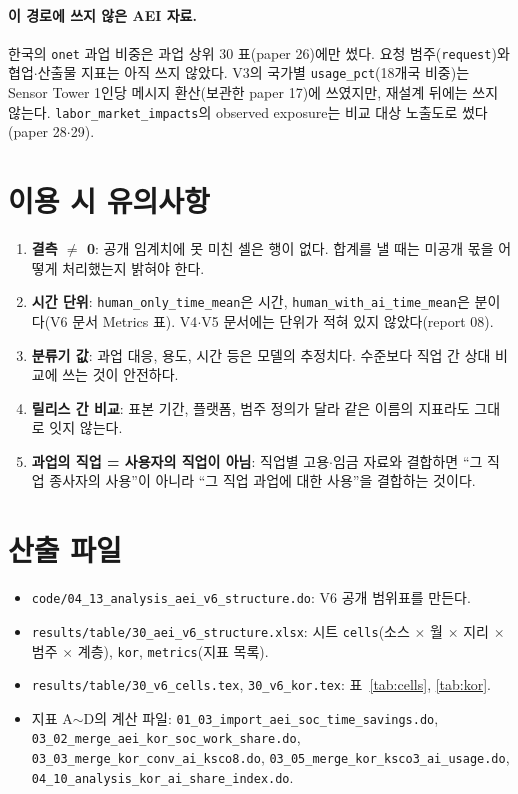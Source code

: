 \documentclass[11pt]{article}
\begin{document}
\paragraph{이 경로에 쓰지 않은 AEI 자료.} 한국의 \texttt{onet} 과업 비중은 과업 상위 30 표(paper 26)에만 썼다. 요청 범주(\texttt{request})와 협업$\cdot$산출물 지표는 아직 쓰지 않았다. V3의 국가별 \texttt{usage\_pct}(18개국 비중)는 Sensor Tower 1인당 메시지 환산(보관한 paper 17)에 쓰였지만, 재설계 뒤에는 쓰지 않는다. \texttt{labor\_market\_impacts}의 observed exposure는 비교 대상 노출도로 썼다(paper 28$\cdot$29).

\section{이용 시 유의사항}

\begin{enumerate}[leftmargin=*]
  \item \textbf{결측 $\ne$ 0}: 공개 임계치에 못 미친 셀은 행이 없다. 합계를 낼 때는 미공개 몫을 어떻게 처리했는지 밝혀야 한다.
  \item \textbf{시간 단위}: \texttt{human\_only\_time\_mean}은 시간, \texttt{human\_with\_ai\_time\_mean}은 분이다(V6 문서 Metrics 표). V4$\cdot$V5 문서에는 단위가 적혀 있지 않았다(report 08).
  \item \textbf{분류기 값}: 과업 대응, 용도, 시간 등은 모델의 추정치다. 수준보다 직업 간 상대 비교에 쓰는 것이 안전하다.
  \item \textbf{릴리스 간 비교}: 표본 기간, 플랫폼, 범주 정의가 달라 같은 이름의 지표라도 그대로 잇지 않는다.
  \item \textbf{과업의 직업 = 사용자의 직업이 아님}: 직업별 고용$\cdot$임금 자료와 결합하면 ``그 직업 종사자의 사용''이 아니라 ``그 직업 과업에 대한 사용''을 결합하는 것이다.
\end{enumerate}

\section{산출 파일}

\begin{itemize}[leftmargin=*]
  \item \texttt{code/04\_13\_analysis\_aei\_v6\_structure.do}: V6 공개 범위표를 만든다.
  \item \texttt{results/table/30\_aei\_v6\_structure.xlsx}: 시트 \texttt{cells}(소스 $\times$ 월 $\times$ 지리 $\times$ 범주 $\times$ 계층), \texttt{kor}, \texttt{metrics}(지표 목록).
  \item \texttt{results/table/30\_v6\_cells.tex}, \texttt{30\_v6\_kor.tex}: 표~\ref{tab:cells}, \ref{tab:kor}.
  \item 지표 A$\sim$D의 계산 파일: \texttt{01\_03\_import\_aei\_soc\_time\_savings.do}, \texttt{03\_02\_merge\_aei\_kor\_soc\_work\_share.do}, \texttt{03\_03\_merge\_kor\_conv\_ai\_ksco8.do}, \texttt{03\_05\_merge\_kor\_ksco3\_ai\_usage.do}, \texttt{04\_10\_analysis\_kor\_ai\_share\_index.do}.
\end{itemize}

\printbibliography[title={참고문헌}]
\end{document}
